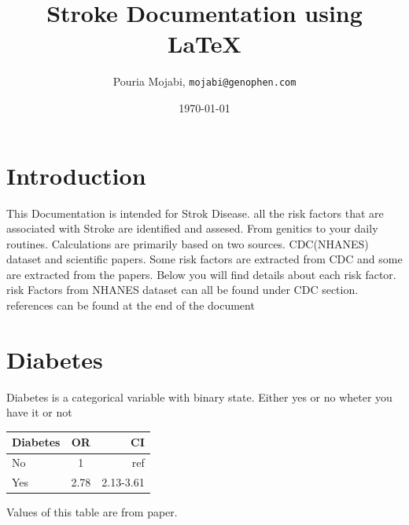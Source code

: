 \documentclass{report}
\begin{document}
\title{Stroke Documentation using \LaTeX{} }
\author{Pouria Mojabi, \texttt{mojabi@genophen.com}}
\date{\today}
\maketitle


\section{Introduction}
This Documentation is intended for Strok Disease. all the risk factors that are associated with Stroke are identified and assesed. 
From genitics to your daily routines. Calculations are primarily based on two sources. CDC(NHANES) dataset and scientific papers. 
Some risk factors are extracted from CDC and some are extracted from the papers. Below you will find details about each risk factor. 
risk Factors from NHANES dataset can all be found under CDC section.
references can be found at the end of the document

\newpage
\section{\color{blue} Diabetes}
Diabetes is a categorical variable with binary state. Either yes or no wheter you have it or not \newline
\begin{tabular}{ | l | c || r |}
\hline
Diabetes & OR & CI\\ \hline
No & 1 & ref \\ \hline
Yes & 2.78 & 2.13-3.61\\ \hline
\end{tabular}
\newline \newline
Values of this table are from \citet{shahar2003} paper.

\newpage
\end{document}
